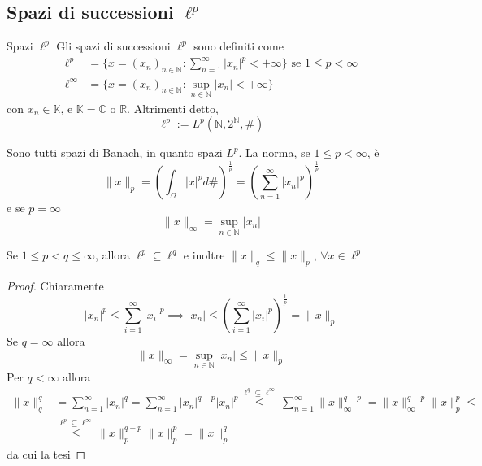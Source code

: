 \subsection{Spazi di successioni \(\ell^{p}\) }
\begin{definition}{Spazi \(\ell^{p}\)}
    Gli spazi di successioni \(\ell^{p}\) sono definiti come
    \begin{align*}
        \ell^{p} &= \{x = {(x_{n})}_{n \in \mathbb{N}} : \sum_{n=1}^{\infty}
        |x_{n}|^{p} < +\infty \} \text{ se } 1 \le p < \infty \\
            \ell^{\infty} &= \{x = {(x_{n})}_{n \in \mathbb{N}} : \sup_{n \in
        \mathbb{N}} |x_{n}| < +\infty\} 
    \end{align*}
    con \(x_{n} \in \mathbb{K}\), e \(\mathbb{K}= \mathbb{C}\) o \(\mathbb{R}\).
    Altrimenti detto, 
    \[
        \ell^{p} := L^{p}{\left( \mathbb{N}, 2^{\mathbb{N}}, \# \right)} 
    \]
\end{definition}
Sono tutti spazi di Banach, in quanto spazi \(L^{p}\). La norma, se \(1 \le p <
\infty\), è
\[
    \|x\|_p = {\left( \int_{\Omega} |x|^{p} d\#  \right)} ^{\frac{1}{p}} =
    {\left( \sum_{n=1}^{\infty} |x_{n}|^{p}  \right)} ^{\frac{1}{p}} 
\]
e se \(p = \infty\) 
\[
    \|x\|_{\infty} = \sup_{n \in \mathbb{N}} |x_{n}|
\]
\begin{proposition}
    Se \(1 \le p < q \le \infty\), allora \(\ell^{p} \subseteq \ell^{q}\) e
    inoltre \(\|x\|_q \le \|x\|_p\), \(\forall x \in \ell^{p}\) 
\end{proposition}
\begin{proof}
    Chiaramente
    \[
       |x_{n}|^{p} \le \sum_{i=1}^{\infty} |x_{i}|^{p} \implies |x_{n}| \le
       {\left( \sum_{i=1}^{\infty} |x_{i}|^{p}  \right)}^{\frac{1}{p}} = \|x\|_p
    \]
    Se \(q = \infty\) allora 
    \[
        \|x\|_{\infty} = \sup_{n \in \mathbb{N}} |x_{n}| \le \|x\|_p
    \]
    Per \(q < \infty\) allora
    \begin{align*}
        \|x\|_q^{q} &= \sum_{n=1}^{\infty} |x_{n}|^{q} = \sum_{n=1}^{\infty}
        |x_{n}|^{q-p}|x_{n}|^{p} \overset{\ell^{q} \subseteq \ell^{\infty} }{\le
        } \sum_{n=1}^{\infty} \|x\|_{\infty} ^{q-p} = \|x\|_{\infty} ^{q-p}
        \|x\|_p^{p} \le \\
        &\overset{\ell^{p} \subseteq\ell^{\infty} }{\le } \|x\|_{p} ^{q-p}
        \|x\|^{p}_p = \|x\|_p^{q} 
    \end{align*}
    da cui la tesi
\end{proof}
